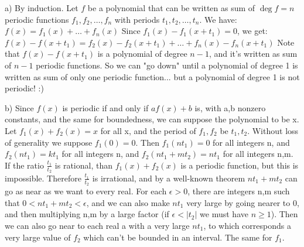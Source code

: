 \begin{solution}
	a) By induction. Let $f$ be a polynomial that can be written as sum of $\deg f = n$ periodic functions $f_{1},f_{2},\ldots,f_{n}$ with periods $t_{1},t_{2},\ldots,t_{n}$.
We have:
$f(x) = f_{1}(x)+\ldots+f_{n}(x)$
Since $f_{1}(x)-f_{1}(x+t_{1}) = 0$, we get:
$f(x)-f(x+t_{1}) = f_{2}(x)-f_{2}(x+t_{1})+\ldots+f_{n}(x)-f_{n}(x+t_{1})$
Note that $f(x)-f(x+t_{1})$ is a polynomial of degree $n-1$, and it's written as sum of $n-1$ periodic functions.
So we can "go down" until a polynomial of degree 1 is written as sum of only one periodic function... but a polynomial of degree 1 is not periodic!  :) 

b) Since $f(x)$ is periodic if and only if $af(x)+b$ is, with a,b nonzero constants, and the same for boundedness, we can suppose the polynomial to be x.
Let $f_{1}(x)+f_{2}(x) = x$ for all x, and the period of $f_{1},f_{2}$ be $t_{1},t_{2}$.
Without loss of generality we suppose $f_{1}(0) = 0$. Then $f_{1}(nt_{1}) = 0$ for all integers n, and $f_{2}(nt_{1}) = kt_{1}$ for all integers n, and $f_{2}(nt_{1}+mt_{2}) = nt_{1}$ for all integers n,m. If the ratio $\frac{t_{1}}{t_{2}}$ is rational, than  $f_{1}(x)+f_{2}(x)$ is a periodic function, but this is impossible. Therefore $\frac{t_{1}}{t_{2}}$ is irrational, and by a well-known theorem $nt_{1}+mt_{2}$ can go as near as we want to every real. 
For each $\epsilon > 0$, there are integers n,m such that $0<nt_{1}+mt_{2}<\epsilon$, and we can also make $nt_{1}$ very large by going nearer to 0, and then multiplying n,m by a large factor (if $\epsilon < |t_{2}|$ we must have $n \ge 1$).
Then we can also go near to each real a with a very large $nt_{1}$, to which corresponds a very large value of $f_{2}$ which can't be bounded in an interval. The same for $f_{1}$.
\end{solution}



